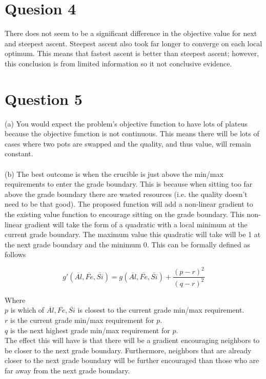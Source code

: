 \documentclass{article}
\begin{document}
\section{Quesion 4}
There does not seem to be a significant difference in the objective
value for next and steepest ascent. Steepest ascent also took far
longer to converge on each local optimum. This means that fastest
ascent is better than steepest ascent; however, this conclusion is from
limited information so it not conclusive evidence.

\section{Question 5}
(a) You would expect the problem's objective function to have lots of 
plateus because the objective function is not continuous. This means
there will be lots of cases where two pots are swapped and the
quality, and thus value, will remain constant.\\\\

\noindent (b) The best outcome is when the crucible is just above
the min/max requirements to enter the grade boundary. This is because
when sitting too far above the grade boundary there are wasted
resources (i.e. the quality doesn't need to be that good).
The proposed function will add a non-linear gradient to the existing
value function to encourage sitting on the grade boundary. This 
non-linear gradient will take the form of a quadratic with a local
minimum at the current grade boundary. The maximum value this
quadratic will take will be 1 at the next grade boundary and the 
minimum 0. This can be formally defined as follows

\[
  g'(\overline{Al}, \overline{Fe}, \overline{Si}) = 
  g(\overline{Al}, \overline{Fe}, \overline{Si})
  + \displaystyle\frac{(p-r)^2}{(q-r)^2}
\]

Where\\
$p$ is which of $\overline{Al}, \overline{Fe}, \overline{Si}$ is
closest to the current grade min/max requirement.\\
$r$ is the current grade min/max requirement for $p$.\\
$q$ is the next highest grade min/max requirement for $p$.\\

The effect this will have is that there will be a gradient encouraging
neighbors to be closer to the next grade boundary. Furthermore,
neighbors that are already closer to the next grade boundary will be
further encouraged than those who are far away from the next grade 
boundary. \\
\end{document}
